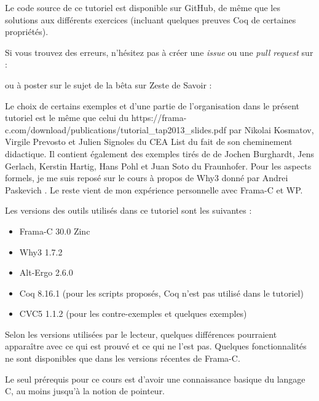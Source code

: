 \begin{Warning}
  Le code source de ce
  tutoriel est disponible sur GitHub, de même que les solutions aux
  différents exercices (incluant quelques preuves Coq de certaines
  propriétés).

  Si vous trouvez des erreurs, n'hésitez pas à créer une \textit{issue} ou
  une \textit{pull request} sur :


  ou à poster sur le sujet de la bêta sur Zeste de Savoir :

\end{Warning}

\begin{Information}
Le choix de certains exemples et d'une partie de l'organisation dans le présent
tutoriel est le même que celui du
             {https://frama-c.com/download/publications/tutorial_tap2013_slides.pdf}
par Nikolai Kosmatov, Virgile Prevosto et Julien Signoles du CEA List du fait de
son cheminement didactique. Il contient également des exemples tirés de
\textit{}
de Jochen Burghardt, Jens Gerlach, Kerstin Hartig, Hans Pohl et Juan Soto du
Fraunhofer. Pour les aspects formels, je me suis reposé sur le cours
à propos de Why3 donné par Andrei Paskevich
\textit{}.
Le reste vient de mon expérience personnelle avec Frama-C et WP.

\horizontalLine

Les versions des outils utilisés dans ce tutoriel sont les suivantes :
\begin{itemize}
\item Frama-C 30.0 Zinc
\item Why3 1.7.2
\item Alt-Ergo 2.6.0
\item Coq 8.16.1 (pour les scripts proposés, Coq n'est pas utilisé dans le tutoriel)
\item CVC5 1.1.2 (pour les contre-exemples et quelques exemples)
\end{itemize}
Selon les versions utilisées par le lecteur, quelques différences pourraient
apparaître avec ce qui est prouvé et ce qui ne l'est pas. Quelques fonctionnalités
ne sont disponibles que dans les versions récentes de Frama-C.

\horizontalLine

Le seul prérequis pour ce cours est d'avoir une connaissance basique du
langage C, au moins jusqu'à la notion de pointeur.


\end{Information}

